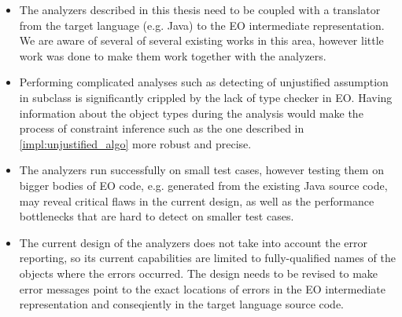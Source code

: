 \begin{itemize}
    \item The analyzers described in this thesis need to be coupled with a translator from the target language (e.g. Java) to the EO intermediate representation. We are aware of several of several existing works in this area, however little work was done to make them work together with the analyzers.
    \item Performing complicated analyses such as detecting of unjustified assumption in subclass is significantly crippled by the lack of type checker in EO. Having information about the object types during the analysis would make the process of constraint inference such as the one described in \ref{impl:unjustified_algo} more robust and precise. 
    \item The analyzers run successfully on small test cases, however testing them on bigger bodies of EO code, e.g. generated from the existing Java source code, may reveal critical flaws in the current design, as well as the performance bottlenecks that are hard to detect on smaller test cases. 
    \item The current design of the analyzers does not take into account the error reporting, so its current capabilities are limited to fully-qualified names of the objects where the errors occurred. The design needs to be revised to make error messages point to the exact locations of errors in the EO intermediate representation and conseqiently in the target language source code.
\end{itemize}

